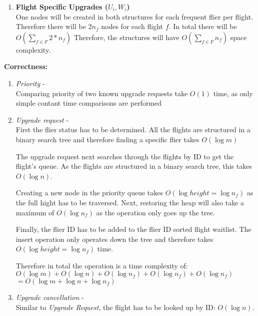 \documentclass{article}
\begin{document}
\begin{enumerate}[label=(\alph*)]
\begin{enumerate}[label=(\arabic*)]
        \item \textbf{Flight Specific Upgrades ($U_i, W_i$)} \\
        One nodes will be created in both structures for each frequent flier
        per flight. Therefore there will be $2 n_f$ nodes for each flight $f$.
        In total there will be $O(\sum_{f\in F}{2*n_f})$
        Therefore, the structures will have $O(\sum_{f\in F}{n_f})$ space complexity.
    \end{enumerate}

    \textbf{Correctness:}
    \begin{enumerate}[label=(\arabic*)]
        \item \emph{Priority} -  \\
            Comparing priority of two known upgrade requests take $O(1)$ time,
            as only simple contant time comparisons are performed

        \item \emph{Upgrade request} -  \\
            First the flier status has to be determined.
            All the flights are structured in a binary search tree
            and therefore finding a specific flier takes $O(\log m)$

            The upgrade request next searches through the flights by ID
            to get the flight's queue. As the flights are structured in a
            binary search tree, this takes $O(\log n)$.

            Creating a new node in the priority queue takes $O(\log{height} = \log{n_f})$
            as the full hight has to be traversed.
            Next, restoring the heap will also take a maximum of $O(\log{n_f})$
            as the operation only goes up the tree.

            Finally, the flier ID has to be added to the flier ID
            sorted flight waitlist. The insert operation only operates
            down the tree and therefore takes $O(\log{height} = \log{n_f})$ time.

            Therefore in total the operation is a time complexity of: \\
            $O(\log m) + O(\log n) + O(\log{n_f}) + O(\log{n_f}) + O(\log{n_f})$ \\
            $=O(\log m + \log n + \log{n_f})$

        \item \emph{Upgrade cancellation} -  \\
            Similar to \emph{Upgrade Request}, the flight has to be
            looked up by ID: $O(\log n)$.
            

\end{enumerate}
\end{enumerate}
\end{document}
